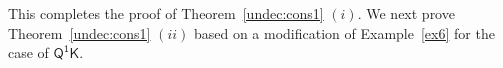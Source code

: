 \documentclass{lmcs} %
\theoremstyle{plain}\newtheorem{satz}[thm]{Satz} %
\newcommand{\FOMK}{\ensuremath{\mathsf{Q^1K}}}
\newcommand{\fform}[1]{\boldsymbol{#1}}
\newcommand{\pvar}{\fform{p}}
\newcommand{\avar}{\fform{a}}
\newcommand{\gvar}{\fform{g}}
\begin{document}
This completes the proof of Theorem~\ref{undec:cons1} $(i)$.
We next prove Theorem~\ref{undec:cons1} $(ii)$ based on a modification of Example~\ref{ex6} for the case of $\FOMK{}$.
% 
\end{document}
